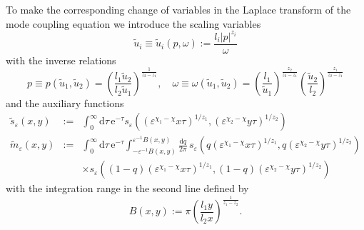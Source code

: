 \documentclass[12pt]{article}
\newcommand{\rmd}{\mathrm{d}}
\newcommand{\rme}{\mathrm{e}}
\begin{document}
To make the corresponding change of variables in the Laplace transform of 
the mode coupling equation we introduce the scaling variables
\begin{equation}
\tilde{u}_i \equiv \tilde{u}_i(p,\omega) := \frac{l_i |p|^{z_i}}{\omega} 
\label{scalvarFLT}
\end{equation}
with the inverse relations
\begin{equation}
p \equiv p(\tilde{u}_1,\tilde{u}_2)
=   \left(\frac{l_1 \tilde{u}_2}{l_2 \tilde{u}_1}\right)^{\frac{1}{z_2-z_1}} , \quad
\omega \equiv \omega(\tilde{u}_1,\tilde{u}_2) = \left(
\frac{l_1}{\tilde{u}_1}
\right)^{\frac{z_2}{z_2-z_1}}
\left(\frac{\tilde{u}_2}{l_2} \right)^{\frac{z_1}{z_2-z_1}} 
\label{scalvarFLTinv}
\end{equation}
and the auxiliary functions
\begin{eqnarray}
\tilde{s}_{\varepsilon}(x,y) & := &
\int_{0}^\infty \rmd \tau \, \rme^{- \tau}
s_{\varepsilon}((\varepsilon^{\chi_1-\chi} x \tau)^{1/z_1},  (\varepsilon^{\chi_2-\chi} y \tau)^{1/z_2}) 
\label{tspmeps} \\
\tilde{m}_{\varepsilon}(x,y) 
& := & \int_{0}^{\infty} \rmd \tau \, \rme^{-\tau} 
\int_{-\varepsilon^{-1}B(x,y)}^{\varepsilon^{-1}B(x,y)} 
\frac{\rmd q}{2\pi} \, 
s_{\varepsilon}(q (\varepsilon^{\chi_1-\chi} x \tau)^{1/z_1},
q (\varepsilon^{\chi_2-\chi} y \tau)^{1/z_2})
\nonumber \\ & & 
\times s_{\varepsilon}((1-q) (\varepsilon^{\chi_1-\chi} x \tau)^{1/z_1},
(1-q) (\varepsilon^{\chi_2-\chi} y \tau)^{1/z_2})
\label{tmpmeps}
\end{eqnarray}
with the integration range in the second line defined by
\begin{equation} 
B(x,y) := \pi \left(\frac{l_1 y}{l_2 x}\right)^{\frac{1}{z_1-z_2}} .
\end{equation} 
\end{document}
